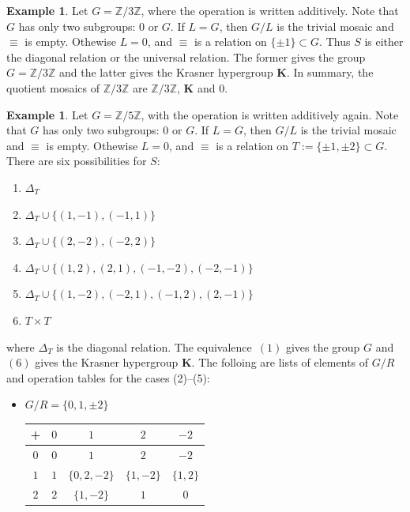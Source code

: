 \documentclass[reqno]{amsart}
\newcommand{\K}{\mathbf{K}}
\numberwithin{equation}{section}
\theoremstyle{plain}
\theoremstyle{definition}
\newtheorem{example}[equation]{Example}
\begin{document}
\begin{example}
    Let $G=\mathbb{Z}/3\mathbb{Z}$, where the operation is written additively. %
    Note that $G$ has only two subgroups: $0$ or $G$. If $L=G$, then $G/L$ is the trivial mosaic and $\equiv$ is empty. Othewise $L=0$, and $\equiv$ is a relation on $\{\pm 1\}\subset G$. Thus $S$ is either the diagonal relation or the universal relation. The former gives the group $G=\mathbb{Z}/3\mathbb{Z}$ and the latter gives the Krasner hypergroup $\K$. In summary, the quotient mosaics of $\mathbb{Z}/3\mathbb{Z}$ are $\mathbb{Z}/3\mathbb{Z}$, $\K$ and $0$.
\end{example}

\begin{example}
    Let $G=\mathbb{Z}/5\mathbb{Z}$, with the operation is written additively again. %
    Note that $G$ has only two subgroups: $0$ or $G$. If $L=G$, then $G/L$ is the trivial mosaic and $\equiv$ is empty. Othewise $L=0$, and $\equiv$ is a relation on $T:=\{\pm 1, \pm2\}\subset G$. There are six possibilities for $S$:
\begin{enumerate}
    \item $\Delta_T$ 
    \item $\Delta_T\cup\{(1, -1), (-1, 1)\}$
    \item $\Delta_T\cup\{(2, -2), (-2, 2)\}$ 
    \item $\Delta_T\cup\{(1, 2), (2, 1), (-1, -2), (-2, -1)\}$
    \item $\Delta_T\cup\{(1, -2), (-2, 1), (-1, 2), (2, -1)\}$
    \item $T\times T$
\end{enumerate}
where $\Delta_T$ is the diagonal relation. The equivalence~$(1)$ gives the group $G$ and~$(6)$ gives the Krasner hypergroup $\K$. The folloing are lists of elements of $G/R$ and operation tables for the cases (2)--(5): 
\begin{itemize}
\item[(2)] $G/R=\{0, 1, \pm 2\}$ 
\begin{center}
\begin{tabular}{ |c|c|c|c|c| } 
\hline
+ & $0$ & $1$ & $2$ & $-2$ \\
\hline
$0$ & $0$ & $1$ & $2$ & $-2$ \\ 
\hline
$1$ & $1$ & $\{0, 2, -2\}$ & $\{1, -2\}$
& $\{1, 2\}$\\ 
\hline
$2$ & $2$ & $\{1, -2\}$ & $1$
& $0$\\ 

\end{tabular}
\end{center}
\end{itemize}
\end{example}
\end{document}
